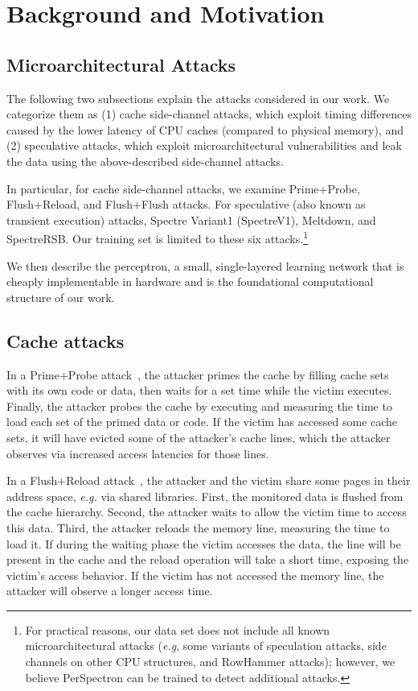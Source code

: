 \section{Background and Motivation}\label{background}
\label{motiv}
\subsection{Microarchitectural Attacks}
The following two subsections explain the attacks considered in our work. 
We categorize them as (1) cache side-channel attacks, which exploit 
timing differences caused by the lower latency of CPU caches 
(compared to physical memory), and (2) speculative attacks, 
which exploit microarchitectural vulnerabilities and leak the data 
using the above-described side-channel attacks. 

In particular, for cache side-channel attacks, we examine Prime+Probe, 
Flush+Reload, and Flush+Flush attacks. For speculative (also known as 
transient execution) attacks, Spectre Variant1 (SpectreV1), Meltdown, 
and SpectreRSB. Our training set is limited to these six attacks.\footnote{For 
practical reasons, our data set does not include all known microarchitectural 
attacks  ({\em e.g}, some variants of speculation attacks, side channels on 
other CPU structures, and RowHammer attacks); however, we believe 
PerSpectron can be trained to detect additional attacks.}

We then describe the perceptron, a small, single-layered learning network
that is cheaply implementable in hardware and is the foundational computational 
structure of our work.

\subsection{Cache attacks}
In a Prime+Probe attack~\cite{PrimeProbe2015last}, the attacker primes the cache 
by filling cache sets with its own code or data, then waits for a set time while 
the victim executes. Finally, the attacker probes the cache by executing and 
measuring the time to load each set of the primed data or code. If the victim has 
accessed some cache sets, it will have evicted some of the attacker's cache 
lines, which the attacker observes via increased access latencies for those lines.

In a Flush+Reload attack~\cite{FlushReload2014Yarom}, the attacker and the 
victim share some pages in their address space, {\em e.g.} via shared libraries. 
First, the monitored data is flushed from the cache hierarchy. Second, 
the attacker waits to allow the victim time to access this data. Third, 
the attacker reloads the memory line, measuring the time to load it. If during 
the waiting phase the victim accesses the data, the line will be present in 
the cache and the reload operation will take a short time, exposing the 
victim's access behavior. If the victim has not accessed the memory 
line, the attacker will observe a longer access time. 


